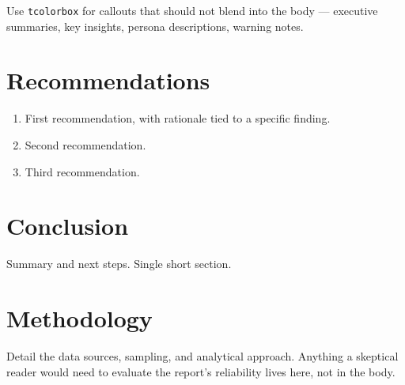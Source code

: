 \documentclass[11pt,a4paper]{article}
\begin{document}
\begin{tcolorbox}[colback=primary!5, colframe=primary!70, title=\textbf{Key Insight}]
Use \texttt{tcolorbox} for callouts that should not blend into the body — executive summaries, key insights, persona descriptions, warning notes.
\end{tcolorbox}

\section{Recommendations}

\begin{enumerate}
  \item First recommendation, with rationale tied to a specific finding.
  \item Second recommendation.
  \item Third recommendation.
\end{enumerate}

\section{Conclusion}

Summary and next steps. Single short section.

\appendix
\section{Methodology}

Detail the data sources, sampling, and analytical approach. Anything a skeptical reader would need to evaluate the report's reliability lives here, not in the body.
\end{document}
